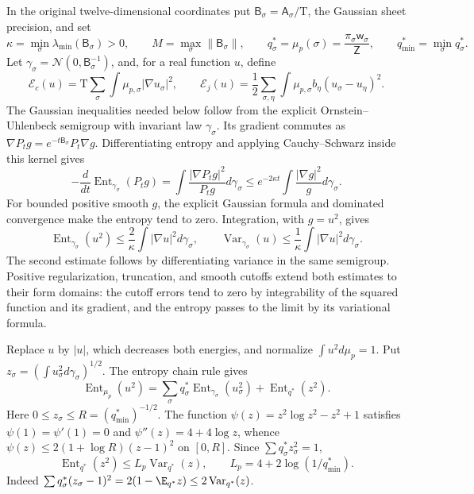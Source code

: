 In the original twelve-dimensional coordinates put
\(\mathsf B_\sigma=\mathsf A_\sigma/\mathrm T\), the Gaussian sheet
precision, and set
\[
 \kappa=\min_\sigma\lambda_{\min}(\mathsf B_\sigma)>0,\qquad
 M=\max_\sigma\|\mathsf B_\sigma\|,\qquad
 q_\sigma^*=\mu_p(\sigma)
 =\frac{\pi_\sigma\mathsf w_\sigma}{\mathsf Z},
 \qquad q_{\min}^*=\min_\sigma q_\sigma^*.
\]
Let \(\gamma_\sigma=\mathcal N(0,\mathsf B_\sigma^{-1})\), and, for a
real function \(u\), define
\[
 \mathscr E_c(u)=\mathrm T\sum_\sigma\int\mu_{p,\sigma}|\nabla u_\sigma|^2,
 \qquad
 \mathscr E_j(u)=\frac12\sum_{\sigma,\eta}\int\mu_{p,\sigma}b_\eta
                                    (u_\sigma-u_\eta)^2.
\]
The Gaussian inequalities needed below follow from the explicit
Ornstein--Uhlenbeck semigroup with invariant law \(\gamma_\sigma\).
Its gradient commutes as
\(\nabla P_tg=e^{-t\mathsf B_\sigma}P_t\nabla g\). Differentiating
entropy and applying Cauchy--Schwarz inside this kernel gives
\[
 -\frac d{dt}\operatorname{Ent}_{\gamma_\sigma}(P_tg)
 =\int\frac{|\nabla P_tg|^2}{P_tg}d\gamma_\sigma
 \le e^{-2\kappa t}\int\frac{|\nabla g|^2}{g}d\gamma_\sigma.
\]
For bounded positive smooth \(g\), the explicit Gaussian formula and
dominated convergence make the entropy tend to zero. Integration, with
\(g=u^2\), gives
\begin{equation}
 \operatorname{Ent}_{\gamma_\sigma}(u^2)
 \le\frac2\kappa\int|\nabla u|^2d\gamma_\sigma,
 \qquad
 \operatorname{Var}_{\gamma_\sigma}(u)
 \le\frac1\kappa\int|\nabla u|^2d\gamma_\sigma.
\label{eq:phil-selection-gaussian-inequalities}
\end{equation}
The second estimate follows by differentiating variance in the same
semigroup. Positive regularization, truncation, and smooth cutoffs extend
both estimates to their form domains: the cutoff errors tend to zero by
integrability of the squared function and its gradient, and the entropy
passes to the limit by its variational formula.

Replace \(u\) by \(|u|\), which decreases both energies, and normalize
\(\int u^2d\mu_p=1\). Put
\(z_\sigma=(\int u_\sigma^2d\gamma_\sigma)^{1/2}\).
The entropy chain rule gives
\[
 \operatorname{Ent}_{\mu_p}(u^2)
 =\sum_\sigma q_\sigma^*
             \operatorname{Ent}_{\gamma_\sigma}(u_\sigma^2)
       +\operatorname{Ent}_{q^*}(z^2).
\]
Here \(0\le z_\sigma\le R=(q_{\min}^*)^{-1/2}\).
The function \(\psi(z)=z^2\log z^2-z^2+1\) satisfies
\(\psi(1)=\psi'(1)=0\) and \(\psi''(z)=4+4\log z\), whence
\(\psi(z)\le2(1+\log R)(z-1)^2\) on \([0,R]\).
Since \(\sum q_\sigma^*z_\sigma^2=1\),
\[
 \operatorname{Ent}_{q^*}(z^2)
 \le L_p\operatorname{Var}_{q^*}(z),\qquad
 L_p=4+2\log(1/q_{\min}^*).
\]
Indeed \(\sum q_\sigma^*(z_\sigma-1)^2
=2(1-\E_{q^*}z)\le2\operatorname{Var}_{q^*}(z)\).

